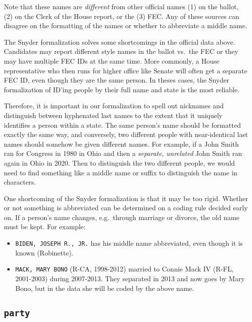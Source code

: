 \documentclass[12pt]{article}
\begin{document}
Note that these names are \emph{different} from other official names (1)
on the ballot, (2) on the Clerk of the House report, or the (3) FEC. Any
of these sources can disagree on the formatting of the names or whether
to abbreviate a middle name.

The Snyder formalization solves some shortcomings in the official data
above. Candidates may report different style names in the ballot vs.~the
FEC or they may have multiple FEC IDs at the same time. More commonly, a
House representative who then runs for higher office like Senate will
often get a separate FEC ID, even though they are the same person. In
theses cases, the Snyder formalization of ID'ing people by their full
name and state is the most reliable.

Therefore, it is important in our formalization to spell out nicknames
and distinguish between hyphenated last names to the extent that it
uniquely identifies a person within a state. The same person's name
should be formatted exactly the same way, and conversely, two different
people with near-identical last names should somehow be given
{different} names. For example, if a John Smith ran for Congress
in 1980 in Ohio and then a \emph{separate, unrelated} John Smith ran
again in Ohio in 2020. Then to distinguish the two different people, we
would need to find {something} like a middle name or suffix to
distinguish the name in characters.

One shortcoming of the Snyder formalization is that it may be
{too} rigid. Whether or not something is abbreviated can be
determined on a coding rule decided early on. If a person's name
changes, e.g.~through marriage or divorce, the old name must be kept.
For example:

\begin{itemize}
\tightlist
\item
  \texttt{BIDEN,\ JOSEPH\ R.,\ JR.} has his middle name abbreviated,
  even though it is known (Robinette).
\item
  \texttt{MACK,\ MARY\ BONO} (R-CA, 1998-2012) married to Connie Mack IV
  (R-FL, 2001-2003) during 2007-2013. They separated in 2013 and now
  goes by Mary Bono, but in the data she will be coded by the above
  name.
\end{itemize}


\newpage

\FloatBarrier


\subsection*{\texttt{party}} 
\end{document}
